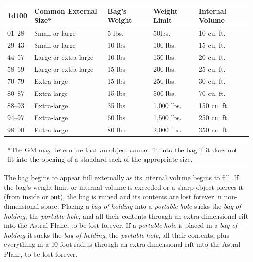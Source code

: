 \begin{multicols}{2}
\noindent \begin{tabular}{|p{}|p{}|p{}|p{}|p{}|}
\hline
1d100	& Common External Size*	& Bag's Weight	& Weight Limit	& Internal Volume \\
\hline\hline
\rowcolor[gray]{0.9}01--28	& Small or large		& 5 lbs.	& 50lbs.	& 10 cu. ft. \\
29--43	& Small or large		& 10 lbs.	& 100 lbs.	& 15 cu. ft. \\
\rowcolor[gray]{0.9}44--57	& Large or extra-large	& 10 lbs.	& 150 lbs.	& 20 cu. ft. \\
58--69	& Large or extra-large	& 15 lbs.	& 200 lbs.	& 25 cu. ft. \\
\rowcolor[gray]{0.9}70--79	& Extra-large			& 15 lbs.	& 250 lbs.	& 30 cu. ft. \\
80--87	& Extra-large			& 15 lbs.	& 500 lbs.	& 70 cu. ft. \\
\rowcolor[gray]{0.9}88--93	& Extra-large			& 35 lbs.	& 1,000 lbs.	& 150 cu. ft. \\
94--97	& Extra-large			& 60 lbs.	& 1,500 lbs.	& 250 cu. ft. \\
\rowcolor[gray]{0.9}98--00	& Extra-large			& 80 lbs.	& 2,000 lbs.	& 350 cu. ft. \\
\hline
\end{tabular}
\noindent\begin{tabular}{p{}}
*The GM may determine that an object cannot fit into the bag if it does not fit into the opening of a standard sack of the appropriate size. \\
\end{tabular}\vspace{.5em}

The bag begins to appear full externally as its internal volume begins to fill.  If the bag's weight limit or internal volume is exceeded or a sharp object pierces it (from inside or out), the bag is ruined and its contents are lost forever in non-dimensional space.  Placing a \textit{bag of holding} into a \textit{portable hole} sucks the \textit{bag of holding}, the \textit{portable hole}, and all their contents through an extra-dimensional rift into the Astral Plane, to be lost forever.  If a \textit{portable hole} is placed in a \textit{bag of holding} it sucks the \textit{bag of holding}, the \textit{portable hole}, all their contents, plus everything in a 10-foot radius through an extra-dimensional rift into the Astral Plane, to be lost forever.


\end{multicols}
